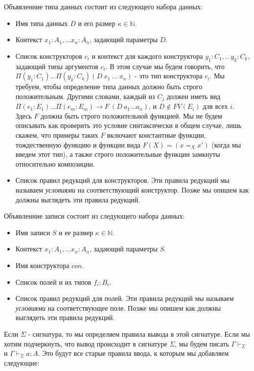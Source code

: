 \documentclass{amsart}
\theoremstyle{definition}
\theoremstyle{remark}
\numberwithin{figure}{section}
\begin{document}
Объявленние типа данных состоит из следующего набора данных:
\begin{itemize}
\item Имя типа данных $D$ и его размер $\kappa \in \mathbb{N}$.
\item Контекст $x_1 : A_1, \ldots x_n : A_n$, задающий параметры $D$.
\item Список конструкторов $c_i$ и контекст для каждого конструктора $y_1 : C_1, \ldots y_k : C_k$, задающий типы аргументов $c_i$.
    В этом случае мы будем говорить, что $\Pi (y_1 : C_1) \ldots \Pi (y_k : C_k) (D\ x_1\ \ldots\ x_n)$ - это тип конструктора $c_i$.
    Мы требуем, чтобы определение типа данных должно быть строго положительным.
    Другими словами, каждый из $C_j$ должен иметь вид $\Pi (e_1 : E_1) \ldots \Pi (e_m : E_m) \to F\ (D\ a_1 \ldots a_n)$, и $D \notin FV(E_i)$ для всех $i$.
    Здесь $F$ должна быть строго положительной функцией.
    Мы не будем описывать как проверить это условие синтаксически в общем случае, лишь скажем, что примеры таких $F$ включают константные функции, тождественную функцию и
        функции вида $F(X) = (x =_X x')$ (когда мы введем этот тип), а также строго положительные функции замкнуты относительно композиции.
\item Список правил редукций для конструкторов.
    Эти правила редукций мы называем \emph{условиями} на соответствующий конструктор.
    Позже мы опишем как должны выглядеть эти правила редукций.
\end{itemize}

Объявленние записи состоит из следующего набора данных:
\begin{itemize}
\item Имя записи $S$ и ее размер $\kappa \in \mathbb{N}$.
\item Контекст $x_1 : A_1, \ldots x_n : A_n$, задающий параметры $S$.
\item Имя конструктора $con$.
\item Список полей и их типов $f_i : B_i$.
\item Список правил редукций для полей.
    Эти правила редукций мы называем \emph{условиями} на соответствующее поле.
    Позже мы опишем как должны выглядеть эти правила редукций.
\end{itemize}

Если $\Sigma$ - сигнатура, то мы определяем правила вывода в этой сигнатуре.
Если мы хотим подчеркнуть, что вывод происходит в сигнатуре $\Sigma$, мы будем писать $\Gamma \vdash_\Sigma$ и $\Gamma \vdash_\Sigma a : A$.
Это будут все старые правила ввода, к которым мы добавляем следующие:
\end{document}

